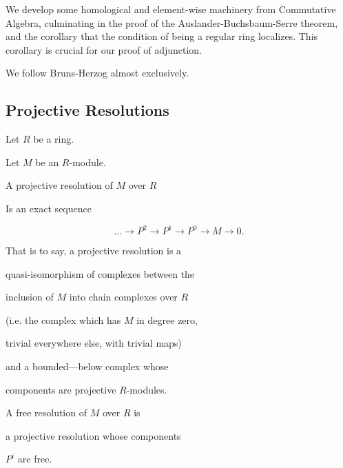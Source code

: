 We develop some 
homological and element-wise machinery
from Commutative Algebra, culminating 
in the proof of the Auslander-Buchsbaum-Serre 
theorem, and 
the corollary that the condition of being 
a regular ring localizes. 
This corollary is crucial for our proof of adjunction.

We follow Bruns-Herzog almost exclusively.








\subsection{Projective Resolutions}



\begin{definition}

  \label{def:projv_resl}

  Let $R$ be a ring. 

  Let $M$ be an $R$-module.

  A projective resolution of $M$ over $R$

  Is an exact sequence

  \[

    \ldots \to P^2 \to P^1 \to P^0 \to M \to 0

  .\]

  That is to say, a projective resolution is a

  quasi-isomorphism of complexes between the 

  inclusion of $M$ into chain complexes over $R$

  (i.e. the complex which has $M$ in degree zero,

  trivial everywhere else, with trivial maps)

  and a bounded—below complex whose

  components are projective $R$-modules.

\end{definition}



\begin{definition}

  \label{def:free_resl}


  A free resolution of $M$ over $R$ is 

  a projective resolution whose components

  $P^i$ are free.

\end{definition}



